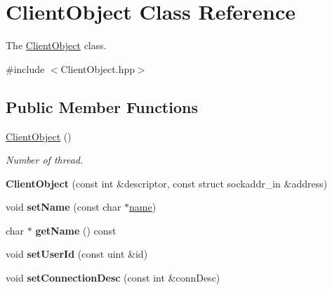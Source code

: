 \hypertarget{classClientObject}{}\section{Client\+Object Class Reference}
\label{classClientObject}


The \hyperlink{classClientObject}{Client\+Object} class.  




{\ttfamily \#include $<$Client\+Object.\+hpp$>$}

\subsection*{Public Member Functions}
\begin{DoxyCompactItemize}
\item 
\mbox{\label{classClientObject_addc3741e6e2134ad75ef35cc50f46e25}} 
\hyperlink{classClientObject_addc3741e6e2134ad75ef35cc50f46e25}{Client\+Object} ()
\begin{DoxyCompactList}\small\item\em Number of thread. \end{DoxyCompactList}\item 
\mbox{\label{classClientObject_a3fc12183abd09f9a49ac7221134cc3bf}} 
{\bfseries Client\+Object} (const int \&descriptor, const struct sockaddr\+\_\+in \&address)
\item 
\mbox{\label{classClientObject_ab91f5a41ec123f2d312c7162eda4dff4}} 
void {\bfseries set\+Name} (const char $\ast$\hyperlink{classClientObject_a29fa4c21633a35a7321e255e7ac10dbc}{name})
\item 
\mbox{\label{classClientObject_a5c4daa9636097bf2905dc53ad08ca81c}} 
char $\ast$ {\bfseries get\+Name} () const
\item 
\mbox{\label{classClientObject_a91713ffa31ed38978f10139dc2ddb81f}} 
void {\bfseries set\+User\+Id} (const uint \&id)
\item 
\mbox{\label{classClientObject_a6cc23f4c8d93b2945399a7c5c0af7501}} 
void {\bfseries set\+Connection\+Desc} (const int \&conn\+Desc)
\item 

\end{DoxyCompactItemize}
